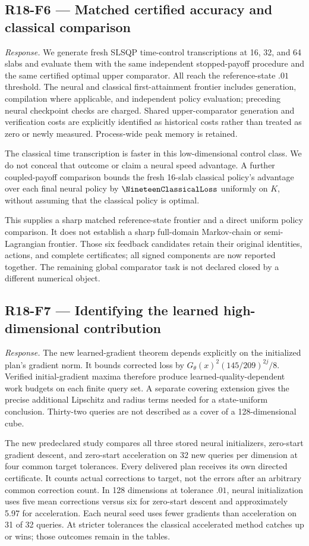\subsection{R18-F6 --- Matched certified accuracy and classical comparison}
\emph{Response.} We generate fresh SLSQP time-control transcriptions at 16, 32, and 64 slabs and evaluate them with the same independent stopped-payoff procedure and the same certified optimal upper comparator. All reach the reference-state $.01$ threshold. The neural and classical first-attainment frontier includes generation, compilation where applicable, and independent policy evaluation; preceding neural checkpoint checks are charged. Shared upper-comparator generation and verification costs are explicitly identified as historical costs rather than treated as zero or newly measured. Process-wide peak memory is retained.

The classical time transcription is faster in this low-dimensional control class. We do not conceal that outcome or claim a neural speed advantage. A further coupled-payoff comparison bounds the fresh 16-slab classical policy's advantage over each final neural policy by $\NineteenClassicalLoss$ uniformly on $K$, without assuming that the classical policy is optimal.

This supplies a sharp matched reference-state frontier and a direct uniform policy comparison. It does not establish a sharp full-domain Markov-chain or semi-Lagrangian frontier. Those six feedback candidates retain their original identities, actions, and complete certificates; all signed components are now reported together. The remaining global comparator task is not declared closed by a different numerical object.

\subsection{R18-F7 --- Identifying the learned high-dimensional contribution}
\emph{Response.} The new learned-gradient theorem depends explicitly on the initialized plan's gradient norm. It bounds corrected loss by $G_\theta(x)^2(145/209)^{2j}/8$. Verified initial-gradient maxima therefore produce learned-quality-dependent work budgets on each finite query set. A separate covering extension gives the precise additional Lipschitz and radius terms needed for a state-uniform conclusion. Thirty-two queries are not described as a cover of a 128-dimensional cube.

The new predeclared study compares all three stored neural initializers, zero-start gradient descent, and zero-start acceleration on 32 new queries per dimension at four common target tolerances. Every delivered plan receives its own directed certificate. It counts actual corrections to target, not the errors after an arbitrary common correction count. In 128 dimensions at tolerance $.01$, neural initialization uses five mean corrections versus six for zero-start descent and approximately 5.97 for acceleration. Each neural seed uses fewer gradients than acceleration on 31 of 32 queries. At stricter tolerances the classical accelerated method catches up or wins; those outcomes remain in the tables.

